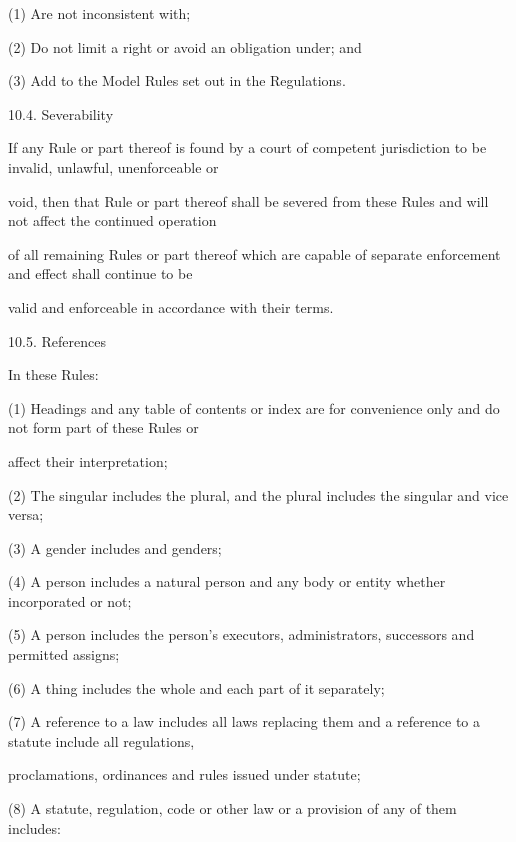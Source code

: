 \documentclass{article}
\begin{document}
{\fontsize{9.962}{1}(1) Are not inconsistent with; }

{\fontsize{9.962}{1}(2) Do not limit a right or avoid an obligation under; and }

{\fontsize{9.962}{1}(3) Add to the Model Rules set out in the Regulations. }

{\fontsize{9.99}{1}10.4. Severability }


{\fontsize{10.02}{1}If any Rule or part thereof is found by a court of competent jurisdiction to be invalid, unlawful, unenforceable or }

{\fontsize{10.02}{1}void, then that Rule or part thereof shall be severed from these Rules and will not affect the continued operation }

{\fontsize{10.02}{1}of all remaining Rules or part thereof which are capable of separate enforcement and effect shall continue to be }

{\fontsize{10.02}{1}valid and enforceable in accordance with their terms. }

{\fontsize{9.99}{1}10.5. References }

{\fontsize{10.02}{1}In these Rules: }

{\fontsize{9.962}{1}(1) Headings and any table of contents or index are for convenience only and do not form part of these Rules or }

{\fontsize{10.02}{1}affect their interpretation; }

{\fontsize{9.962}{1}(2) The singular includes the plural, and the plural includes the singular and vice versa; }

{\fontsize{9.962}{1}(3) A gender includes and genders; }

{\fontsize{9.962}{1}(4) A person includes a natural person and any body or entity whether incorporated or not; }

{\fontsize{9.962}{1}(5) A person includes the person’s executors, administrators, successors and permitted assigns; }

{\fontsize{9.962}{1}(6) A thing includes the whole and each part of it separately; }

{\fontsize{9.962}{1}(7) A reference to a law includes all laws replacing them and a reference to a statute include all regulations, }

{\fontsize{10.02}{1}proclamations, ordinances and rules issued under statute; }

{\fontsize{9.962}{1}(8) A statute, regulation, code or other law or a provision of any of them includes: }
\end{document}

